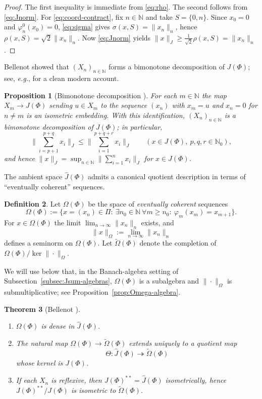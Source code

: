 \documentclass[reqno]{amsart}
\theoremstyle{plain}
\newtheorem{theorem}{Theorem}[section]
\newtheorem{proposition}[theorem]{Proposition}
\theoremstyle{definition}
\newtheorem{definition}[theorem]{Definition}
\theoremstyle{remark}
\newcommand{\N}{\mathbb{N}}
\renewcommand{\le}{\leqslant}
\renewcommand{\ge}{\geqslant}
\begin{document}
\begin{proof}
The first inequality is immediate from \eqref{eq:rho}.
The second follows from \eqref{eq:Jnorm}.
For \eqref{eq:coord-contract}, fix $n\in\N$ and take $S=\{0,n\}$.
Since $x_0=0$ and $\varphi_n^0(x_0)=0$, \eqref{eq:sigma} gives
$\sigma(x,S)=\|x_n\|_n$, hence $\rho(x,S)=\sqrt{2}\|x_n\|_n$.
Now \eqref{eq:Jnorm} yields $\|x\|_{J}\ge \frac1{\sqrt2}\rho(x,S)=\|x_n\|_n$.
\end{proof}

Bellenot showed that $(X_n)_{n\in\N}$ forms a bimonotone decomposition of
$J(\Phi)$; see, \emph{e.g.}, \cite[Prop.\ 2.1]{GonzalezPello2023} for a clean modern
account.

\begin{proposition}[Bimonotone decomposition {\cite{Bellenot1982}}]\label{prop:bimonotone}
For each $m\in\N$ the map $X_m\to J(\Phi)$ sending $u\in X_m$ to the sequence
$(x_n)$ with $x_m=u$ and $x_n=0$ for $n\neq m$ is an isometric embedding.
With this identification, $(X_n)_{n\in\N}$ is a bimonotone decomposition of
$J(\Phi)$; in particular,
\[
\Big\|\sum_{i=p+1}^{p+q} x_i\Big\|_J \le \Big\|\sum_{i=1}^{p+q+r} x_i\Big\|_J
\qquad
(x\in J(\Phi),\ p,q,r\in\N_0),
\]
and hence $\|x\|_J=\sup_{n\in\N}\big\|\sum_{i=1}^n x_i\big\|_J$ for $x\in J(\Phi)$.
\end{proposition}

The ambient space $\widehat{J}(\Phi)$ admits a canonical quotient description
in terms of ``eventually coherent'' sequences.

\begin{definition}\label{def:Omega}
Let $\Omega(\Phi)$ be the space of \emph{eventually coherent} sequences
\[
\Omega(\Phi)
:=
\Big\{x=(x_n)\in\Pi:\ \exists n_0\in\N\ \forall m\ge n_0:\ \varphi_m(x_m)=x_{m+1}\Big\}.
\]
For $x\in\Omega(\Phi)$ the limit $\lim_{n\to\infty}\|x_n\|_n$ exists, and
\[
\|x\|_{\Omega}:=\lim_{n\to\infty}\|x_n\|_n
\]
defines a seminorm on $\Omega(\Phi)$.
Let $\widetilde{\Omega}(\Phi)$ denote the completion of
$\Omega(\Phi)/\ker\|\cdot\|_{\Omega}$.
\end{definition}
\medskip
\noindent
We will use below that, in the Banach-algebra setting of Subsection~\ref{subsec:Jsum-algebras},
$\Omega(\Phi)$ is a subalgebra and $\|\cdot\|_{\Omega}$ is submultiplicative; see Proposition~\ref{prop:Omega-algebra}.

\begin{theorem}[Bellenot {\cite[Thm.\ 1.1]{Bellenot1982}}]\label{thm:Bellenot-quot}
\begin{enumerate}
\item $\Omega(\Phi)$ is dense in $\widehat{J}(\Phi)$.
\item The natural map $\Omega(\Phi)\to \widetilde{\Omega}(\Phi)$ extends uniquely
      to a quotient map
      \[
      \Theta\colon \widehat{J}(\Phi)\twoheadrightarrow \widetilde{\Omega}(\Phi)
      \]
      whose kernel is $J(\Phi)$.
\item If each $X_n$ is reflexive, then $J(\Phi)^{**}=\widehat{J}(\Phi)$ isometrically,
      hence $J(\Phi)^{**}/J(\Phi)$ is isometric to $\widetilde{\Omega}(\Phi)$.
\end{enumerate}
\end{theorem}
\end{document}
